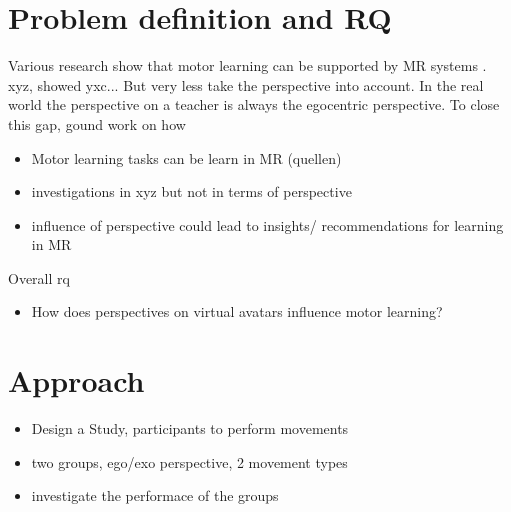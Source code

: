 \section{Problem definition and RQ}
Various research show that motor learning can be supported by MR systems \todo. xyz, showed yxc... But very less take the perspective into account. In the real world the perspective on a teacher is always the egocentric perspective.
To close this gap, gound work on how 
\begin{itemize}
	\item Motor learning tasks can be learn in MR (quellen)
	\item investigations in xyz but not in terms of perspective
	\item influence of perspective could lead to insights/ recommendations for learning in MR
\end{itemize}
Overall rq
\begin{itemize}
	\item How does perspectives on virtual avatars influence motor learning?
\end{itemize}
\begin{comment}
\begin{itemize}
	\item RQ1: Does the perspective on a Virtual Avatar influence the learning performance (?better: outcome?)?
	\item RQ2: When the movement is only on a specific body part like upper body (UB), lower body (LB) or full body (FB), is there a relation between the egocentric or exocentric perspective on the avatar to the learning performance?
	\item H1: The perspective on the avatar has no influence on UB movements
	\item H2: The perspective on the avatar has no influence on LB movements
	\item H3: The perspective on the avatar has no influence on FB movements
	\item H4: The perspective on the avatar has no preferences on movement types, means the movement type has no influence on the learning performance 
\end{itemize}
\end{comment}


\section{Approach}
\begin{itemize}
	\item Design a Study, participants to perform movements
	\item two groups, ego/exo perspective, 2 movement types
	\item investigate the performace of the groups
\end{itemize}

